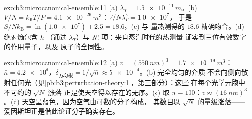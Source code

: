\begin{solution}{exo:b3:microcanonical-ensemble:11}
(a) $\lambda_T = \qty{1.6e-11}{m}$。(b) $V/N = k_{\text{B}}T/P =
\qty{4.1e-26}{m^3}$：$V/N\lambda_T^3 = \num{1.0e7}$，
于是 $S/Nk_{\text{B}} = \ln(\num{1.0e7}) + 2.5 = 18.6$。(c) 与
量热测得的 $18.6$ 精确吻合。(d) 绝对熵包含 $h$
（通过 $\lambda_T$）与 $N!$ 项：来自蒸汽时代的热测量
证实到三位有效数字的作用量子，以及
原子的全同性。
\end{solution}

\begin{solution}{exo:b3:microcanonical-ensemble:12}
(a) $v = (\qty{550}{nm})^3 = \qty{1.7e-19}{m^3}$：$\bar n =
\num{4.2e6}$，$\delta_{\text{方均根}} = 1/\sqrt{\bar n} \approx
\num{5e-4}$。(b) 完全均匀的介质
不会向侧向散射任何光（见\cref{pb:b3:perturbation-theory:1}，第三部分）：这些
在每个光学元胞中不可约的 $\sqrt N$ 涨落
正是使天空得以存在的无序。(c) 取 $\bar n = 100$：$v
\approx (\qty{16}{nm})^3$。(d) 天空呈蓝色，因为空气由可数的分子构成，
其数目以 $\sqrt N$ 的量级涨落——
爱因斯坦正是借此论证分子确实存在。
\end{solution}


